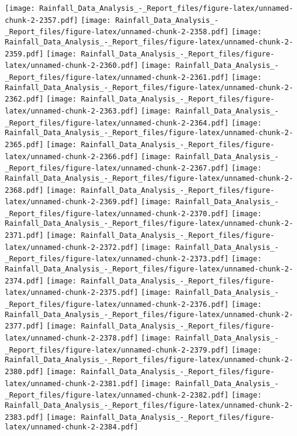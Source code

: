 \documentclass[
]{article}
\begin{document}
\texttt{[image: Rainfall\_Data\_Analysis\_-\_Report\_files/figure-latex/unnamed-chunk-2-2357.pdf]}
\texttt{[image: Rainfall\_Data\_Analysis\_-\_Report\_files/figure-latex/unnamed-chunk-2-2358.pdf]}
\texttt{[image: Rainfall\_Data\_Analysis\_-\_Report\_files/figure-latex/unnamed-chunk-2-2359.pdf]}
\texttt{[image: Rainfall\_Data\_Analysis\_-\_Report\_files/figure-latex/unnamed-chunk-2-2360.pdf]}
\texttt{[image: Rainfall\_Data\_Analysis\_-\_Report\_files/figure-latex/unnamed-chunk-2-2361.pdf]}
\texttt{[image: Rainfall\_Data\_Analysis\_-\_Report\_files/figure-latex/unnamed-chunk-2-2362.pdf]}
\texttt{[image: Rainfall\_Data\_Analysis\_-\_Report\_files/figure-latex/unnamed-chunk-2-2363.pdf]}
\texttt{[image: Rainfall\_Data\_Analysis\_-\_Report\_files/figure-latex/unnamed-chunk-2-2364.pdf]}
\texttt{[image: Rainfall\_Data\_Analysis\_-\_Report\_files/figure-latex/unnamed-chunk-2-2365.pdf]}
\texttt{[image: Rainfall\_Data\_Analysis\_-\_Report\_files/figure-latex/unnamed-chunk-2-2366.pdf]}
\texttt{[image: Rainfall\_Data\_Analysis\_-\_Report\_files/figure-latex/unnamed-chunk-2-2367.pdf]}
\texttt{[image: Rainfall\_Data\_Analysis\_-\_Report\_files/figure-latex/unnamed-chunk-2-2368.pdf]}
\texttt{[image: Rainfall\_Data\_Analysis\_-\_Report\_files/figure-latex/unnamed-chunk-2-2369.pdf]}
\texttt{[image: Rainfall\_Data\_Analysis\_-\_Report\_files/figure-latex/unnamed-chunk-2-2370.pdf]}
\texttt{[image: Rainfall\_Data\_Analysis\_-\_Report\_files/figure-latex/unnamed-chunk-2-2371.pdf]}
\texttt{[image: Rainfall\_Data\_Analysis\_-\_Report\_files/figure-latex/unnamed-chunk-2-2372.pdf]}
\texttt{[image: Rainfall\_Data\_Analysis\_-\_Report\_files/figure-latex/unnamed-chunk-2-2373.pdf]}
\texttt{[image: Rainfall\_Data\_Analysis\_-\_Report\_files/figure-latex/unnamed-chunk-2-2374.pdf]}
\texttt{[image: Rainfall\_Data\_Analysis\_-\_Report\_files/figure-latex/unnamed-chunk-2-2375.pdf]}
\texttt{[image: Rainfall\_Data\_Analysis\_-\_Report\_files/figure-latex/unnamed-chunk-2-2376.pdf]}
\texttt{[image: Rainfall\_Data\_Analysis\_-\_Report\_files/figure-latex/unnamed-chunk-2-2377.pdf]}
\texttt{[image: Rainfall\_Data\_Analysis\_-\_Report\_files/figure-latex/unnamed-chunk-2-2378.pdf]}
\texttt{[image: Rainfall\_Data\_Analysis\_-\_Report\_files/figure-latex/unnamed-chunk-2-2379.pdf]}
\texttt{[image: Rainfall\_Data\_Analysis\_-\_Report\_files/figure-latex/unnamed-chunk-2-2380.pdf]}
\texttt{[image: Rainfall\_Data\_Analysis\_-\_Report\_files/figure-latex/unnamed-chunk-2-2381.pdf]}
\texttt{[image: Rainfall\_Data\_Analysis\_-\_Report\_files/figure-latex/unnamed-chunk-2-2382.pdf]}
\texttt{[image: Rainfall\_Data\_Analysis\_-\_Report\_files/figure-latex/unnamed-chunk-2-2383.pdf]}
\texttt{[image: Rainfall\_Data\_Analysis\_-\_Report\_files/figure-latex/unnamed-chunk-2-2384.pdf]}
\end{document}
